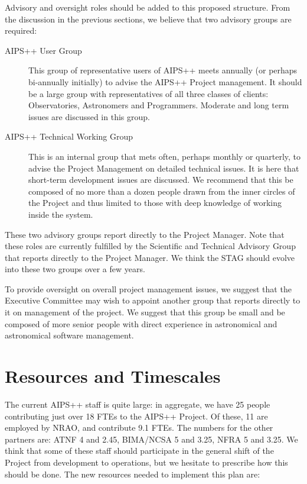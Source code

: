 Advisory and oversight roles should be added to this proposed
structure. From the discussion in the previous sections, we believe
that two advisory groups are required:

\begin{description}
\item[AIPS++ User Group] This group of representative users of AIPS++ 
meets annually (or perhaps bi-annually initially) to advise the AIPS++
Project management.  It should be a large group with representatives
of all three classes of clients: Observatories, Astronomers and
Programmers. Moderate and long term issues are discussed in this
group.
\item[AIPS++ Technical Working Group] This is an internal group that
mets often, perhaps monthly or quarterly, to advise the Project
Management on detailed technical issues. It is here that short-term
development issues are discussed. We recommend that this be composed of
no more than a dozen people drawn from the inner circles of the Project
and thus limited to those with deep knowledge of working inside the
system.
\end{description}

These two advisory groups report directly to the Project Manager. Note
that these roles are currently fulfilled by the Scientific and Technical
Advisory Group that reports directly to the Project Manager. We think the
STAG should evolve into these two groups over a few years.

To provide oversight on overall project management issues, we suggest
that the Executive Committee may wish to appoint another group that
reports directly to it on management of the project. We suggest that
this group be small and be composed of more senior people with direct
experience in astronomical and astronomical software management.

\section{Resources and Timescales}

The current AIPS++ staff is quite large: in aggregate, we have 25
people contributing just over 18 FTEs to the AIPS++ Project. Of these,
11 are employed by NRAO, and contribute 9.1 FTEs. The numbers for the
other partners are: ATNF 4 and 2.45, BIMA/NCSA 5 and 3.25, NFRA 5 and
3.25. We think that some of these staff should participate in the
general shift of the Project from development to operations, but we
hesitate to prescribe how this should be done. The new resources
needed to implement this plan are:


